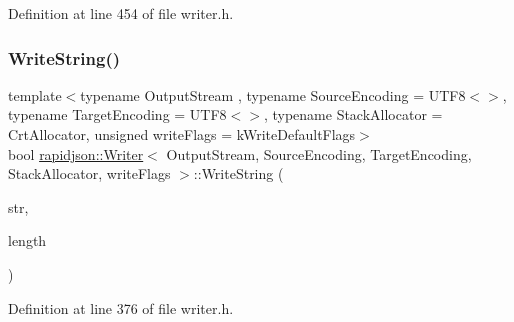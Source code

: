 Definition at line 454 of file writer.\+h.


\begin{DoxyCode}{0}

\end{DoxyCode}
\mbox{\label{classrapidjson_1_1_writer_a95860b89f9a9eea9d4336f0023c497ce}} 
\subsubsection{\texorpdfstring{WriteString()}{WriteString()}}
{\footnotesize\ttfamily template$<$typename Output\+Stream , typename Source\+Encoding  = U\+T\+F8$<$$>$, typename Target\+Encoding  = U\+T\+F8$<$$>$, typename Stack\+Allocator  = Crt\+Allocator, unsigned write\+Flags = k\+Write\+Default\+Flags$>$ \\
bool \mbox{\hyperlink{classrapidjson_1_1_writer}{rapidjson\+::\+Writer}}$<$ Output\+Stream, Source\+Encoding, Target\+Encoding, Stack\+Allocator, write\+Flags $>$\+::Write\+String (\begin{DoxyParamCaption}\item[{const \mbox{\hyperlink{classrapidjson_1_1_writer_a2cf973937ca1110293bf1350fac2a6d6}{Ch}} $\ast$}]{str,  }\item[{\mbox{\hyperlink{namespacerapidjson_a44eb33eaa523e36d466b1ced64b85c84}{Size\+Type}}}]{length }\end{DoxyParamCaption})\hspace{0.3cm}{\ttfamily [protected]}}



Definition at line 376 of file writer.\+h.



